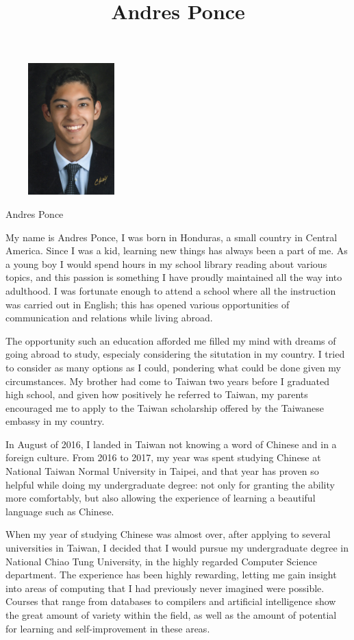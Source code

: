 \documentclass{article}
\title{Andres Ponce}
\begin{document}
\includegraphics[width=2in,height=2in,right]{images/foto.jpg}
\begin{center}
\Huge Andres Ponce
\end{center}

My name is Andres Ponce, I was born in Honduras, a small country
in Central America. Since I was a kid, learning new things has 
always been a part of me. As a young boy I would spend hours
in my school library reading about various topics, and this passion
is something I have proudly maintained all the way into adulthood. 
I was fortunate enough to attend a school where all the instruction
was carried out in English; this has opened various opportunities 
of communication and relations while living abroad. 

The opportunity such an education afforded me filled my mind with 
dreams of going abroad to study, especialy considering the 
situtation in my country. I tried to consider as many options 
as I could, pondering what could be done given my  circumstances. 
My brother had come to Taiwan two years before I graduated high school,
and given how positively he referred to Taiwan, my parents encouraged
me to apply to the Taiwan scholarship offered by the Taiwanese embassy 
in my country. 

In August of 2016, I landed in Taiwan not knowing a word of Chinese 
and in a foreign culture. From 2016 to 2017, my year was spent studying
Chinese at National Taiwan Normal University in Taipei, and that year 
has proven so helpful while doing my undergraduate degree: not only for
granting the ability more comfortably, but also allowing the experience
of learning a beautiful language such as Chinese.  

When my year of studying Chinese was almost over, after applying to 
several universities in Taiwan, I decided that I would pursue my 
undergraduate degree in National Chiao Tung University, in the 
highly regarded Computer Science department. The experience has been
highly rewarding, letting me gain insight into areas of computing 
that I had previously never imagined were possible. Courses that range
from databases to compilers and artificial intelligence show the great
amount of variety within the field, as well as the amount of potential
for learning and self-improvement in these areas.
\end{document}
